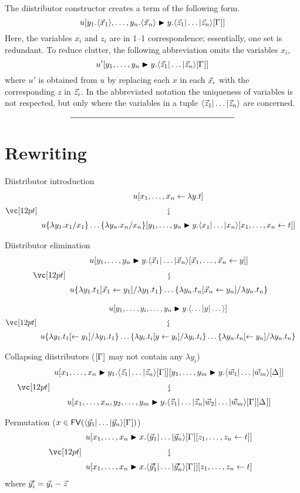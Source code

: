 \documentclass{amsart}
\begin{document}


The diistributor constructor creates a term of the following form.
\[
	u\diistr*{y_1.\tup*{\vv*x_1},\ldots,y_n.\tup*{\vv*x_n}}y{\ttup*z\G}
\]
Here, the variables $x_i$ and $z_i$ are in 1--1 correspondence; essentially, one set is redundant.
%
To reduce clutter, the following abbreviation omits the variables $x_i$,
\[
	u'\diistr yy{\ttup*z\G}
\]
where $u'$ is obtained from $u$ by replacing each $x$ in each $\vv*x_i$ with the corresponding $z$ in $\vv*z_i$.
%
In the abbreviated notation the uniqueness of variables is not respected, but only where the variables in a tuple $\ttup*z$ are concerned.


\[
	\rule{200pt}{.5pt}
\]


\section*{Rewriting}

\noindent
Diistributor introduction
\[
\displayrewrite
  { u\share x{\lambda y.t} }
  { u\subsabs xyx\diistr yy{\ttup x\share xt} }
\]

\bigskip
\bigskip
\bigskip

\noindent
Diistributor elimination
\[
\displayrewrite
  { u\diistr yy{\ttup*x\share{\vv*x}y} }
  { u\sub{\lambda y_1.t_1}{\lambda y_1.t_1\share*{\vv*x_1}{y_1}} \dotso
     \sub{\lambda y_n.t_n}{\lambda y_n.t_n\share*{\vv*x_n}{y_n}} }
\]

\bigskip

\[
\displayrewrite
  { u\diistr*{y_1,\dotsc,y_i,\dotsc,y_n}y{\tup*{\dotso|y|\dotso}} }
  { u\sub{\lambda y_1.t_1}{\lambda y_1.t_1\share*{}{y_1}} \dotso
     \sub{\lambda y_i.t_i}{\lambda y_i.t_i\share*{y}{y_i}} \dotso
     \sub{\lambda y_n.t_n}{\lambda y_n.t_n\share*{}{y_n}} }
\]

\bigskip
\bigskip
\bigskip

\noindent
Collapsing diistributors ($\G$ may not contain any $\lambda y_i$)
\[
\displayrewrite
  { u\diistr x{y_1}{\ttup*z\G}\diistr[m]yy{\ttup*[m]w\G*} }
  { u\diistr*{\vv x,y_2,\dotsc,y_m}y{\tup*{\vv*z_1|\dotso|\vv*z_n|\vv*w_2|\dotso|\vv*w_m}\G\G*} }
\]


\bigskip
\bigskip
\bigskip

\noindent
Permutation ($x\in\FV(\ttup*y\G)$)
\[
\displayrewrite
  { u\diistr xx{\ttup*y\G\share zt} }
  { u\diistr xx{\ttup{\vv*y'}\G}\share zt }
\]
where $\vv*y'_i=\vv*y_i-\vv*z$
\end{document}
